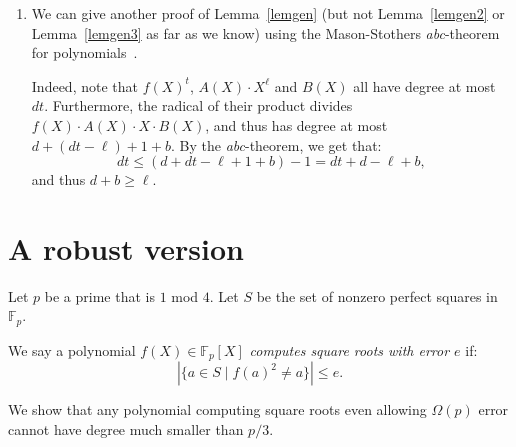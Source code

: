 \documentclass{article}
\newcommand{\F}{\mathbb{F}}
\begin{document}
\begin{enumerate}
 \item We can give another proof of Lemma~\ref{lemgen} (but not Lemma~\ref{lemgen2} or Lemma~\ref{lemgen3} as far as we know) using the Mason-Stothers {\em abc}-theorem for polynomials~\cite{abcthm1,abcthm2}. 
 
 Indeed, note that $f(X)^t$, $A(X) \cdot X^\ell$ and $B(X)$ all have degree at most $dt$. Furthermore, the radical of their product divides $f(X) \cdot A(X) \cdot X \cdot B(X)$, and thus has degree at most 
 $d + (dt-\ell) + 1 + b$. By the {\em abc}-theorem, we get that:
 $$ dt \leq (d + dt - \ell + 1 + b) - 1 = dt + d - \ell + b,$$
 and thus $d + b \geq \ell$. 
 
\end{enumerate}


\section{A robust version}

Let $p$ be a prime that is $1$ mod $4$. 
Let $S$ be the set of nonzero perfect squares in $\F_p$.

We say a polynomial $f(X) \in \F_p[X]$ {\em computes square roots with error $e$} if:
$$ \left|\{a \in S \mid f(a)^2 \neq a  \}\right| \leq e.$$

We show that any polynomial computing square roots even allowing $\Omega(p)$ error cannot have degree much smaller than $p/3$.
\end{document}
